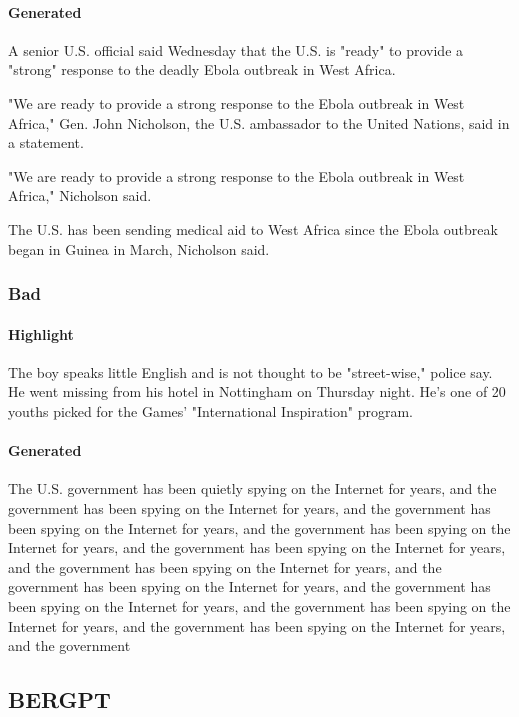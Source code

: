 \documentclass{article}
\begin{document}
\paragraph{Generated} 
A senior U.S. official said Wednesday that the U.S. is "ready" to provide a "strong" response to the deadly Ebola outbreak in West Africa.

"We are ready to provide a strong response to the Ebola outbreak in West Africa," Gen. John Nicholson, the U.S. ambassador to the United Nations, said in a statement.

"We are ready to provide a strong response to the Ebola outbreak in West Africa," Nicholson said.

The U.S. has been sending medical aid to West Africa since the Ebola outbreak began in Guinea in March, Nicholson said.


\subsubsection{Bad}

\paragraph{Highlight}
The boy speaks little English and is not thought to be "street-wise," police say. He went missing from his hotel in Nottingham on Thursday night. He's one of 20 youths picked for the Games' "International Inspiration" program.

\paragraph{Generated} 


The U.S. government has been quietly spying on the Internet for years, and the government has been spying on the Internet for years, and the government has been spying on the Internet for years, and the government has been spying on the Internet for years, and the government has been spying on the Internet for years, and the government has been spying on the Internet for years, and the government has been spying on the Internet for years, and the government has been spying on the Internet for years, and the government has been spying on the Internet for years, and the government has been spying on the Internet for years, and the government

\subsection{BERGPT}
\label{bergpt-wo}
\end{document}
